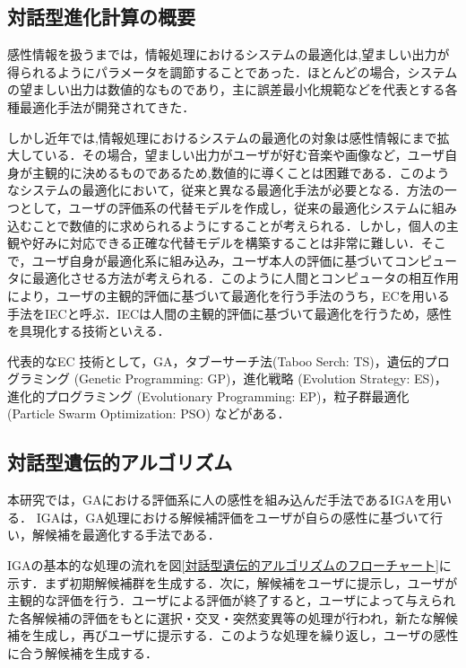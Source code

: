 \subsection{対話型進化計算の概要}
\label{sec2.2.1}

感性情報を扱うまでは，情報処理におけるシステムの最適化は,望ましい出力が得られるようにパラメータを調節することであった．ほとんどの場合，システムの望ましい出力は数値的なものであり，主に誤差最小化規範などを代表とする各種最適化手法が開発されてきた\cite{GA2}．

しかし近年では,情報処理におけるシステムの最適化の対象は感性情報にまで拡大している．その場合，望ましい出力がユーザが好む音楽や画像など，ユーザ自身が主観的に決めるものであるため,数値的に導くことは困難である．このようなシステムの最適化において，従来と異なる最適化手法が必要となる．方法の一つとして，ユーザの評価系の代替モデルを作成し，従来の最適化システムに組み込むことで数値的に求められるようにすることが考えられる．しかし，個人の主観や好みに対応できる正確な代替モデルを構築することは非常に難しい．そこで，ユーザ自身が最適化系に組み込み，ユーザ本人の評価に基づいてコンピュータに最適化させる方法が考えられる．このように人間とコンピュータの相互作用により，ユーザの主観的評価に基づいて最適化を行う手法のうち，ECを用いる手法をIECと呼ぶ\cite{IEC}．IECは人間の主観的評価に基づいて最適化を行うため，感性を具現化する技術といえる．

代表的なEC 技術として，GA，タブーサーチ法(Taboo Serch: TS)，遺伝的プログラミング (Genetic Programming: GP)，進化戦略 (Evolution Strategy: ES)，進化的プログラミング (Evolutionary Programming: EP)，粒子群最適化 (Particle Swarm Optimization: PSO) などがある．
    
\subsection{対話型遺伝的アルゴリズム}
\label{sec2.2.2}

本研究では，GAにおける評価系に人の感性を組み込んだ手法であるIGAを用いる．
IGAは，GA処理における解候補評価をユーザが自らの感性に基づいて行い，解候補を最適化する手法である．

IGAの基本的な処理の流れを図\ref{対話型遺伝的アルゴリズムのフローチャート}に示す．まず初期解候補群を生成する．次に，解候補をユーザに提示し，ユーザが主観的な評価を行う．ユーザによる評価が終了すると，ユーザによって与えられた各解候補の評価をもとに選択・交叉・突然変異等の処理が行われ，新たな解候補を生成し，再びユーザに提示する．このような処理を繰り返し，ユーザの感性に合う解候補を生成する．

